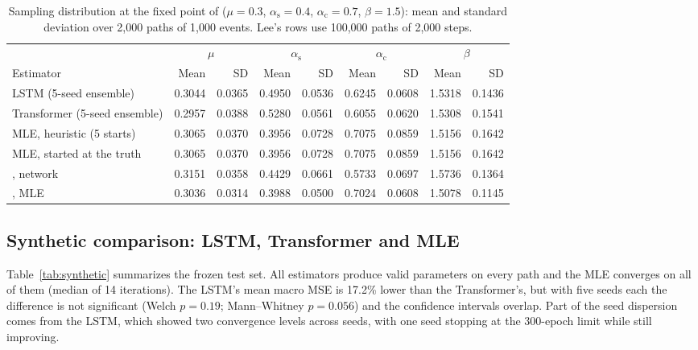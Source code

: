 \documentclass[preprint,12pt,authoryear]{elsarticle}
\newcommand{\aself}{\alpha_{\mathrm{s}}}
\newcommand{\across}{\alpha_{\mathrm{c}}}
\begin{document}
\begin{table}[t]
\centering
\caption{Sampling distribution at the fixed point of \citet{lee2023}
($\mu=0.3$, $\aself=0.4$, $\across=0.7$, $\beta=1.5$): mean and standard deviation over
2,000 paths of 1,000 events. Lee's rows use 100,000 paths of 2,000 steps.}
\label{tab:e2}
\footnotesize
\setlength{\tabcolsep}{4pt}
\begin{tabular}{lrrrrrrrr}
\toprule
 & \multicolumn{2}{c}{$\mu$} & \multicolumn{2}{c}{$\aself$} & \multicolumn{2}{c}{$\across$}
 & \multicolumn{2}{c}{$\beta$}\\
\cmidrule(lr){2-3}\cmidrule(lr){4-5}\cmidrule(lr){6-7}\cmidrule(lr){8-9}
Estimator & Mean & SD & Mean & SD & Mean & SD & Mean & SD\\
\midrule
LSTM (5-seed ensemble) & 0.3044 & 0.0365 & 0.4950 & 0.0536 & 0.6245 & 0.0608 & 1.5318 & 0.1436\\
Transformer (5-seed ensemble) & 0.2957 & 0.0388 & 0.5280 & 0.0561 & 0.6055 & 0.0620 & 1.5308 & 0.1541\\
MLE, heuristic (5 starts) & 0.3065 & 0.0370 & 0.3956 & 0.0728 & 0.7075 & 0.0859 & 1.5156 & 0.1642\\
MLE, started at the truth & 0.3065 & 0.0370 & 0.3956 & 0.0728 & 0.7075 & 0.0859 & 1.5156 & 0.1642\\
\citet{lee2023}, network & 0.3151 & 0.0358 & 0.4429 & 0.0661 & 0.5733 & 0.0697 & 1.5736 & 0.1364\\
\citet{lee2023}, MLE & 0.3036 & 0.0314 & 0.3988 & 0.0500 & 0.7024 & 0.0608 & 1.5078 & 0.1145\\
\bottomrule
\end{tabular}
\end{table}

\subsection{Synthetic comparison: LSTM, Transformer and MLE}

Table~\ref{tab:synthetic} summarizes the frozen test set. All estimators produce valid
parameters on every path and the MLE converges on all of them (median of 14 iterations).
The LSTM's mean macro MSE is 17.2\% lower than the Transformer's, but with five seeds each
the difference is not significant (Welch $p=0.19$; Mann--Whitney $p=0.056$) and the
confidence intervals overlap. Part of the seed dispersion comes from the LSTM, which showed
two convergence levels across seeds, with one seed stopping at the 300-epoch limit while
still improving.
\end{document}
